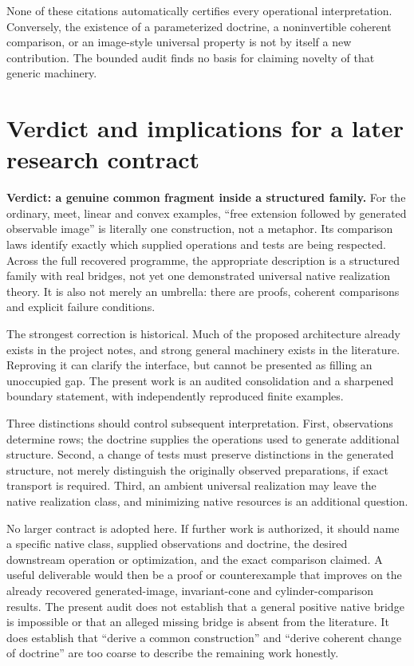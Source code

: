 \documentclass[11pt]{article}
\begin{document}
None of these citations automatically certifies every operational interpretation. Conversely, the existence of a parameterized doctrine, a noninvertible coherent comparison, or an image-style universal property is not by itself a new contribution. The bounded audit finds no basis for claiming novelty of that generic machinery.

\section{Verdict and implications for a later research contract}

\textbf{Verdict: a genuine common fragment inside a structured family.} For the ordinary, meet, linear and convex examples, ``free extension followed by generated observable image'' is literally one construction, not a metaphor. Its comparison laws identify exactly which supplied operations and tests are being respected. Across the full recovered programme, the appropriate description is a structured family with real bridges, not yet one demonstrated universal native realization theory. It is also not merely an umbrella: there are proofs, coherent comparisons and explicit failure conditions.

The strongest correction is historical. Much of the proposed architecture already exists in the project notes, and strong general machinery exists in the literature. Reproving it can clarify the interface, but cannot be presented as filling an unoccupied gap. The present work is an audited consolidation and a sharpened boundary statement, with independently reproduced finite examples.

Three distinctions should control subsequent interpretation. First, observations determine rows; the doctrine supplies the operations used to generate additional structure. Second, a change of tests must preserve distinctions in the generated structure, not merely distinguish the originally observed preparations, if exact transport is required. Third, an ambient universal realization may leave the native realization class, and minimizing native resources is an additional question.

No larger contract is adopted here. If further work is authorized, it should name a specific native class, supplied observations and doctrine, the desired downstream operation or optimization, and the exact comparison claimed. A useful deliverable would then be a proof or counterexample that improves on the already recovered generated-image, invariant-cone and cylinder-comparison results. The present audit does not establish that a general positive native bridge is impossible or that an alleged missing bridge is absent from the literature. It does establish that ``derive a common construction'' and ``derive coherent change of doctrine'' are too coarse to describe the remaining work honestly.
\end{document}
